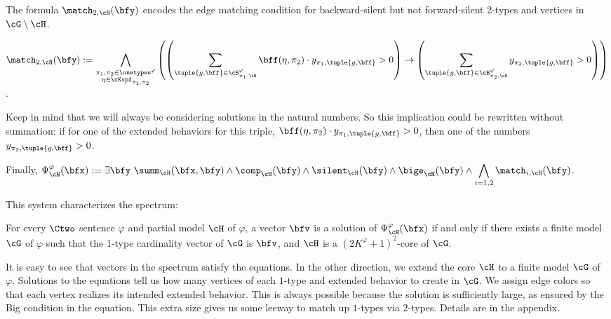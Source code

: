 \begin{compactitem}
    \item
        The formula $\match_{2, \cH}(\bfy)$ encodes the edge matching condition for backward-silent but not forward-silent 2-types and vertices in $\cG \setminus \cH$. \\
        \begin{notsotiny}
        $\displaystyle
        \match_{2, \cH}(\bfy)
         := 
        \bigwedge_{\substack{
            \pi_1, \pi_2 \in \onetypes^\varphi \\
            \eta \in \cKvpf_{\pi_1, \pi_2}}}
        \left(
            \left(
                \sum_{\tuple{g, \bff} \in \cB^{\varphi}_{\pi_1, \cH}} \bff(\eta, \pi_2) \cdot y_{\pi_1, \tuple{g, \bff}} > 0
            \right)
            \to
            \left(
                \sum_{\tuple{g, \bff} \in \cB^{\varphi}_{\pi_2, \cH}} y_{\pi_2, \tuple{g, \bff}} > 0
            \right)
        \right)
        $.
        \end{notsotiny}
        Keep in mind that we will always be considering solutions in the natural numbers. So this implication could be rewritten without summation: if for one of the extended behaviors for this triple, $\bff(\eta, \pi_2) \cdot y_{\pi_1, \tuple{g, \bff}} > 0$, then  one of the numbers $y_{\pi_2, \tuple{g, \bff}} > 0$.
\end{compactitem}
Finally, $\displaystyle
    \Psi^\varphi_{\cH}(\bfx)
         :=
         \exists \bfy\ 
        \summ_{\cH}(\bfx, \bfy) \land
        \comp_{\cH}(\bfy) \land
        \silent_{\cH}(\bfy) \land
        \bige_{\cH}(\bfy) \land
        \bigwedge_{i=1, 2}
        \match_{i, \cH}(\bfy)$.

This system characterizes the spectrum:
\begin{lemma}\label{lem:c2_spec_core}
    For every $\Ctwo$ sentence $\varphi$ and partial model $\cH$ of $\varphi$,
    a vector $\bfv$ is a solution of $\Psi^\varphi_\cH(\bfx)$
    if and only if
    there exists a finite model $\cG$ of $\varphi$ such that
    the 1-type cardinality vector of $\cG$ is $\bfv$,
    and $\cH$ is a $(2K^\varphi+1)^2$-core of $\cG$.
\end{lemma}

It is easy to see that vectors in the spectrum satisfy the equations. 
In the other direction, we extend the core $\cH$ to a finite model $\cG$ of $\varphi$.
Solutions to the equations tell us how many vertices of each $1$-type and extended behavior to create in $\cG$.
We assign edge colors so that each vertex realizes its intended extended behavior.
This is always possible because the solution is sufficiently large, as ensured by the Big condition in the equation. This extra size gives us some leeway to match up $1$-types via $2$-types.
Details are in the appendix.

